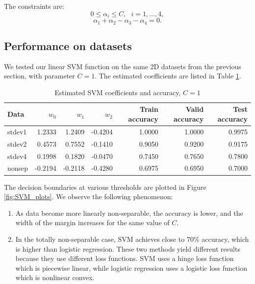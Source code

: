 The constraints are:
%
\begin{equation}
0 \leq \alpha_i \leq C,~~~i=1,\ldots ,4,
\end{equation}
\begin{equation}
\alpha_1 + \alpha_2 - \alpha_3 - \alpha_4 = 0.
\end{equation}

\subsection{Performance on datasets}

We tested our linear SVM function on the same 2D datasets from the previous section, with parameter $C = 1$.  The estimated coefficients are listed in Table \ref{tab:SVM_reg_coeff}.

\begin{table}[h!]
\centering
\caption{Estimated SVM coefficients and accuracy, $C = 1$ }
\begin{tabular}{lrrrrrr}
  \hline\hline
  Data   & $w_0$ 	& $w_1$ 	  & $w_2$ 	& Train accuracy & Valid accuracy & Test accuracy\\
  \hline
  stdev1 & 1.2333    &1.2409   & -0.4204         & 1.0000    &1.0000     & 0.9975\\
  stdev2 & 0.4573    & 0.7552   & -0.1410        & 0.9050    & 0.9200    & 0.9175\\
  stdev4 & 0.1998    & 0.1820   & -0.0470        & 0.7450    & 0.7650    & 0.7800\\
  nonsep &-0.2194   & -0.2118  & -0.4280        & 0.6975    & 0.6950    & 0.7000\\
  \hline\hline
\end{tabular}\label{tab:SVM_reg_coeff}
\end{table}

The decision boundaries at various thresholds are plotted in Figure \ref{fig:SVM_plots}. We observe the following phenomenon:
\begin{enumerate}
\item As data become more linearly non-separable, the accuracy is lower, and the width of the margin increases for the same value of $C$.  
\item In the totally non-separable case, SVM achieves close to 70\% accuracy, which is higher than logistic regression.  These two methods yield different results because they use different loss functions.  SVM uses a hinge loss function which is piecewise linear, while logistic regression uses a logistic loss function which is nonlinear convex.  
\end{enumerate}

